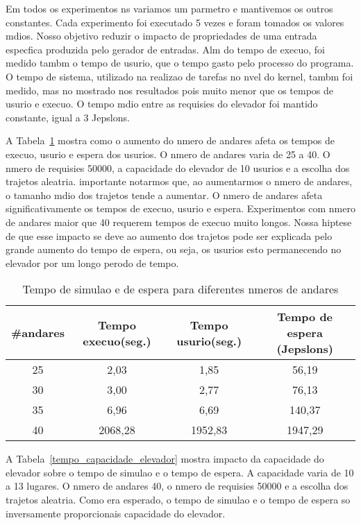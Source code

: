 \documentclass[12pt]{article}
\begin{document}
Em todos os experimentos ns variamos um parmetro e mantivemos os outros constantes. Cada experimento foi executado 5 vezes e foram tomados os valores mdios. Nosso objetivo  reduzir o impacto de propriedades de uma entrada especfica produzida pelo gerador de entradas.  Alm do tempo de execuo, foi medido tambm o tempo de usurio, que  o tempo gasto pelo processo do programa. O tempo de sistema, utilizado na realizao de tarefas no nvel do kernel, tambm foi medido, mas no  mostrado nos resultados pois  muito menor que os tempos de usurio e execuo. O tempo mdio entre as requisies do elevador foi mantido constante, igual a 3 Jepslons.

A Tabela~\ref{tempo_n_andares} mostra como o aumento do nmero de andares afeta os tempos de  execuo, usurio e espera dos usurios. O nmero de andares varia de 25 a 40. O nmero de requisies  50000, a capacidade do elevador  de 10 usurios e a escolha dos trajetos  aleatria.  importante notarmos que, ao aumentarmos o nmero de andares, o tamanho mdio dos trajetos tende a aumentar. O nmero de andares afeta significativamente os tempos de execuo, usurio e espera. Experimentos com nmero de andares maior que 40 requerem tempos de execuo muito longos. Nossa hiptese de que esse impacto se deve ao aumento dos trajetos pode ser explicada pelo grande aumento do tempo de espera, ou seja, os usurios esto permanecendo no elevador por um longo perodo de tempo.

\begin{table}[ht!]
\centering
\begin{footnotesize}
\begin{tabular}{|c|c|c|c|}
\hline
\textbf{\#andares}              		& \textbf{Tempo execuo(seg.)} & \textbf{Tempo usurio(seg.)}      & \textbf{Tempo de espera (Jepslons)}\\ \hline
25	& 2,03		& 1,85		& 56,19\\ \hline
30	& 3,00		& 2,77		& 76,13\\ \hline
35	& 6,96		& 6,69		& 140,37\\ \hline
40	& 2068,28	& 1952,83	& 1947,29\\ \hline
\end{tabular}
\end{footnotesize}
\caption{Tempo de simulao e de espera para diferentes nmeros de andares \label{tempo_n_andares}}
\end{table}

A Tabela~\ref{tempo_capacidade_elevador} mostra impacto da capacidade do elevador sobre o tempo de simulao e o tempo de espera. A capacidade varia de 10 a 13 lugares. O nmero de andares  40, o nmero de requisies  50000 e a escolha dos trajetos  aleatria. Como era esperado, o tempo de simulao e o tempo de espera so inversamente proporcionais  capacidade do elevador.
\end{document}
